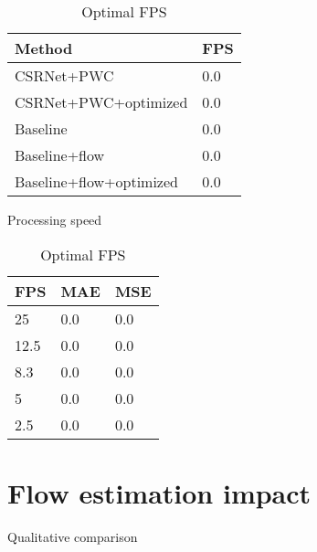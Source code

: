 \begin{table}[]
\begin{minipage}{.5\linewidth}
\centering
\begin{tabular}{ll}
\hline
Method                             & FPS \\ \hline
\multicolumn{1}{l|}{CSRNet+PWC}    & 0.0 \\
\multicolumn{1}{l|}{CSRNet+PWC+optimized}& 0.0 \\
\multicolumn{1}{l|}{Baseline}      & 0.0 \\
\multicolumn{1}{l|}{Baseline+flow} & 0.0 \\
\multicolumn{1}{l|}{Baseline+flow+optimized} & 0.0 \\ \hline
\end{tabular}
\caption{\label{tab:fps_fudan}Processing speed}
\end{minipage} %
\begin{minipage}{.5\linewidth}
\centering
\begin{tabular}{lll}
		\hline
		FPS                               & MAE & MSE \\ \hline
		\multicolumn{1}{l|}{25}          & 0.0 & 0.0 \\
		\multicolumn{1}{l|}{12.5}        & 0.0 & 0.0 \\
		\multicolumn{1}{l|}{8.3}        & 0.0 & 0.0 \\
		\multicolumn{1}{l|}{5}        & 0.0 & 0.0 \\
		\multicolumn{1}{l|}{2.5} & 0.0 & 0.0 \\ \hline
		\end{tabular}
\caption{\label{tab:fps_fudan} Optimal FPS}
\end{minipage}
\end{table}

\section{Flow estimation impact}
Qualitative comparison